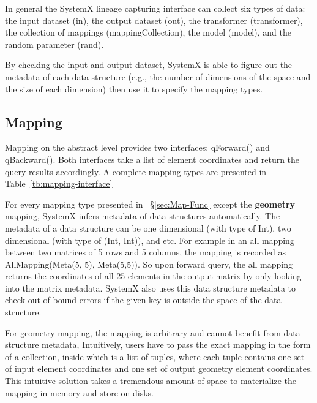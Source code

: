 \documentclass{sig-alternate}
\begin{document}
In general the SystemX lineage capturing interface can collect six types of data: 
the input dataset (in), the output dataset (out), the transformer (transformer), 
the collection of mappings (mappingCollection), the model (model), and the random 
parameter (rand).

By checking the input and output dataset, SystemX is able to figure out the metadata of each data structure 
(e.g., the number of dimensions of the space and the size of each dimension) then use it to specify the mapping types.

\subsection{Mapping}
\label{sec:Design-Mapping}
Mapping on the abstract level provides two interfaces: qForward() and qBackward(). Both interfaces
take a list of element coordinates and return the query results accordingly.
A complete mapping types are presented in Table~\ref{tb:mapping-interface}

For every mapping type presented in ~\S\ref{sec:Map-Func} except the {\bf geometry} mapping, 
SystemX infers metadata of data structures automatically. 
The metadata  of a data structure can be one dimensional (with type of Int), two dimensional (with type of (Int, Int)), and etc.
For example in an all mapping between two matrices of 5 rows and 5 columns,
the mapping is recorded as AllMapping(Meta(5, 5), Meta(5,5)). 
So upon forward query, the all mapping returns the coordinates of all 25 elements in the output matrix by only looking into the matrix metadata.
SystemX also uses this data structure metadata to check out-of-bound errors if the given key is outside the space of the data structure.

For geometry mapping, the mapping is arbitrary and cannot benefit from data structure metadata, 
Intuitively, users have to pass the exact mapping in the form of a collection, inside which is a list of tuples, where each tuple 
contains one set of input element coordinates and one set of output geometry element coordinates. 
This intuitive solution takes a tremendous amount of space to materialize the mapping in memory and store on disks.
\end{document}
